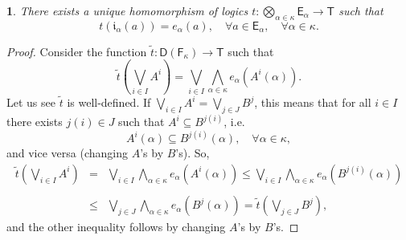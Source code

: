 \documentclass[10pt,a4paper]{amsart}
\newtheorem{thm}{}
\begin{document}
\begin{thm}
There exists a unique homomorphism of logics $t:{\textstyle \bigotimes_{\alpha\in\kappa}}\mathsf{E}_{\alpha}\rightarrow\mathsf{T}$
such that 
\begin{equation}
t\left(\mathfrak{i}_{\alpha}\left(a\right)\right)=e_{\alpha}\left(a\right),\quad\forall a\in\mathsf{E}_{\alpha},\quad\forall\alpha\in\kappa.\label{tia}
\end{equation}
\end{thm}

\begin{proof}
Consider the function $\tilde{t}:\mathsf{D}\left(\mathsf{F}_{\kappa}\right)\rightarrow\mathsf{T}$
such that 
\begin{equation}
\tilde{t}\left({\textstyle \bigvee_{i\in I}}A^{i}\right)={\textstyle \bigvee_{i\in I}}{\textstyle \bigwedge_{\alpha\in\kappa}}e_{\alpha}\left(A^{i}\left(\alpha\right)\right).\label{dt}
\end{equation}
Let us see $\tilde{t}$ is well-defined. If ${\textstyle \bigvee_{i\in I}}A^{i}={\textstyle \bigvee_{j\in J}}B^{j}$,
this means that for all $i\in I$ there exists $j\left(i\right)\in J$
such that $A^{i}\subseteq B^{j\left(i\right)}$, i.e. 
\[
A^{i}\left(\alpha\right)\subseteq B^{j\left(i\right)}\left(\alpha\right),\quad\forall\alpha\in\kappa,
\]
and vice versa (changing $A$'s by $B$'s). So, 
\[
\begin{array}{lll}
\tilde{t}\left({\textstyle \bigvee_{i\in I}}A^{i}\right) & = & {\textstyle \bigvee_{i\in I}}{\textstyle \bigwedge_{\alpha\in\kappa}}e_{\alpha}\left(A^{i}\left(\alpha\right)\right)\leq{\textstyle \bigvee_{i\in I}}{\textstyle \bigwedge_{\alpha\in\kappa}}e_{\alpha}\left(B^{j\left(i\right)}\left(\alpha\right)\right)\\
\\
 & \leq & {\textstyle \bigvee_{j\in J}}{\textstyle \bigwedge_{\alpha\in\kappa}}e_{\alpha}\left(B^{j}\left(\alpha\right)\right)=\tilde{t}\left({\textstyle \bigvee_{j\in J}}B^{j}\right),
\end{array}
\]
and the other inequality follows by changing $A$'s by $B$'s. 


\end{proof}
\end{document}
